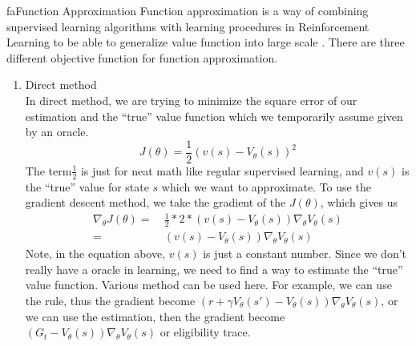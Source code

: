 \documentclass[9pt]{article}
\begin{document}
\begin{topic}{fa}{Function Approximation}
Function approximation is a way of combining supervised learning algorithms with learning procedures in Reinforcement Learning to be able to generalize value function into large scale . There are three different objective function for function approximation. 
\begin{enumerate}
\item Direct method\\
In direct method, we are trying to minimize the square error of our estimation and the ``true'' value function which we temporarily assume given by an oracle.
\[
J(\theta) = \frac{1}{2}(v(s) - V_{\theta}(s))^2
\]
The term$\frac{1}{2}$ is just for neat math like regular supervised learning, and $v(s)$ is the ``true'' value for state $s$ which we want to approximate. To use the gradient descent method, we take the gradient of the $J(\theta)$, which gives us
\[
\begin{split}
\nabla_{\theta} J(\theta) = &\ \frac{1}{2} * 2 * (v(s) - V_{\theta}(s)) \nabla_{\theta} V_{\theta}(s)\\
= &\ (v(s) - V_{\theta}(s)) \nabla_{\theta} V_{\theta}(s)
\end{split}
\]
Note, in the equation above, $v(s)$ is just a constant number. Since we don't really have a oracle in learning, we need to find a way to estimate the ``true'' value function. Various method can be used here. For example, we can use the  rule, thus the gradient become $(r + \gamma V_{\theta}(s') - V_{\theta}(s)) \nabla_{\theta} V_{\theta}(s)$, or we can use the  estimation, then the gradient become $(G_t - V_{\theta}(s)) \nabla_{\theta} V_{\theta}(s)$ or eligibility trace.


\end{enumerate}
\end{topic}
\end{document}
